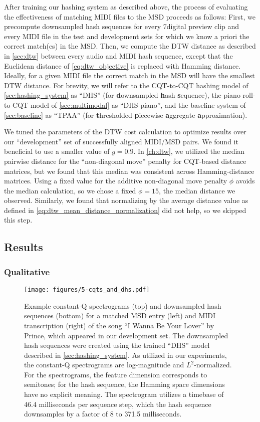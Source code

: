 After training our hashing system as described above, the process of evaluating the effectiveness of matching MIDI files to the MSD proceeds as follows:
First, we precompute downsampled hash sequences for every 7digital preview clip and every MIDI file in the test and development sets for which we know a priori the correct match(es) in the MSD.
Then, we compute the DTW distance as described in \cref{sec:dtw} between every audio and MIDI hash sequence, except that the Euclidean distance of \cref{eq:dtw_objective} is replaced with Hamming distance.
Ideally, for a given MIDI file the correct match in the MSD will have the smallest DTW distance.
For brevity, we will refer to the CQT-to-CQT hashing model of \cref{sec:hashing_system} as ``DHS'' (for \textbf{d}ownsampled \textbf{h}ash \textbf{s}equence), the piano roll-to-CQT model of \cref{sec:multimodal} as ``DHS-piano'', and the baseline system of \cref{sec:baseline} as ``TPAA'' (for \textbf{t}hresholded \textbf{p}iecewise \textbf{a}ggregate \textbf{a}pproximation).

We tuned the parameters of the DTW cost calculation to optimize results over our ``development'' set of successfully aligned MIDI/MSD pairs.
We found it beneficial to use a smaller value of $g = 0.9$.
In \cref{ch:dtw}, we utilized the median pairwise distance for the ``non-diagonal move'' penalty for CQT-based distance matrices, but we found that this median was consistent across Hamming-distance matrices.
Using a fixed value for the additive non-diagonal move penalty $\phi$ avoids the median calculation, so we chose a fixed $\phi = 15$, the median distance we observed.
Similarly, we found that normalizing by the average distance value as defined in \cref{eq:dtw_mean_distance_normalization} did not help, so we skipped this step.

\subsection{Results}

\subsubsection{Qualitative}

\begin{figure}
  \texttt{[image: figures/5-cqts\_and\_dhs.pdf]}
  \caption[Spectrograms and downsampled hash sequences for a matching pair]{Example constant-Q spectrograms (top) and downsampled hash sequences (bottom) for a matched MSD entry (left) and MIDI transcription (right) of the song ``I Wanna Be Your Lover'' by Prince, which appeared in our development set.
The downsampled hash sequences were created using the trained ``DHS'' model described in \cref{sec:hashing_system}.
As utilized in our experiments, the constant-Q spectrograms are log-magnitude and $L^2$-normalized.
For the spectrograms, the feature dimension corresponds to semitones; for the hash sequence, the Hamming space dimensions have no explicit meaning.
The spectrogram utilizes a timebase of 46.4 milliseconds per sequence step, which the hash sequence downsamples by a factor of 8 to 371.5 milliseconds.}
  \label{fig:cqts_and_dhs}
\end{figure}

